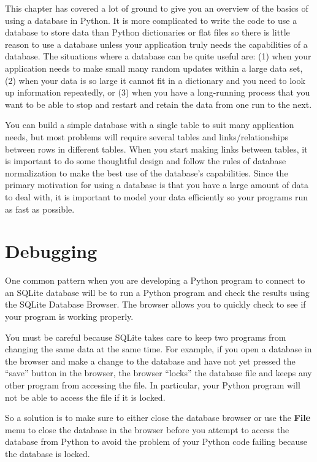 This chapter has covered a lot of ground to give you an overview of the basics
of using a database in Python.   It is more complicated to write the code to use 
a database to store data than Python dictionaries or flat files so there is 
little reason to use a database unless your application truly needs the capabilities
of a database.  The situations where a database can be quite useful are: 
(1) when your application needs to make small many random updates within a large data set,
(2) when your data is so large it cannot fit in a dictionary and you need to 
look up information repeatedly, or (3) when you have a long-running process that you
want to be able to stop and restart and retain the data from one run to the next.

You can build a simple database with a single table to suit many application 
needs, but most problems will require several tables and links/relationships
between rows in different tables.   When you start making links between 
tables, it is important to do some thoughtful design and follow the 
rules of database normalization to make the best use of the database's
capabilities.  Since the primary motivation for using a database
is that you have a large amount of data to deal with, it is important
to model your data efficiently so your programs run as fast as possible.

\section{Debugging}

One common pattern when you are developing a Python program to connect to
an SQLite database will be to run a Python program and check the
results using the SQLite Database Browser.  The browser allows you 
to quickly check to see if your program is working properly.

You must be careful because SQLite takes care to keep two programs
from changing the same data at the same time.   For example, if
you open a database in the browser and make a change to the database
and have not yet pressed the ``save'' button in the browser, the 
browser ``locks'' the database file and keeps any other program
from accessing the file.  In particular, your Python program
will not be able to access the file if it is locked.

So a solution is to make sure to either close the database browser 
or use the {\bf File} menu to close the database in the browser
before you attempt to access the database from Python to avoid
the problem of your Python code failing because the database is
locked.

